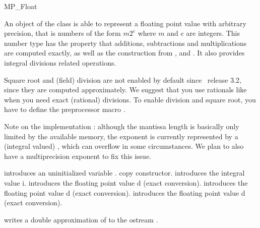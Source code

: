 
\begin{ccRefClass}{MP_Float}

\ccDefinition
An object of the class  is able to represent a floating point
value with arbitrary precision, that is numbers of the form $m2^e$ where
$m$ and $e$ are integers.  This number type has the property that
additions, subtractions and multiplications are computed exactly, as well as
the construction from ,  and .
It also provides integral divisions related operations.

Square root and (field) division are not enabled by default since
\cgal\ release 3.2, since they are computed approximately.  We suggest that you
use rationals like  when you need exact (rational)
divisions.  To enable division and square root, you have to define the
preprocessor macro .

Note on the implementation : although the mantissa length is basically only
limited by the available memory, the exponent is currently represented by a
(integral valued) , which can overflow in some circumstances.  We
plan to also have a multiprecision exponent to fix this issue.


\ccIsModel
{}

\ccCreation
{}

{introduces an uninitialized variable \ccVar.}
\ccGlue
{}
{copy constructor.}
\ccGlue
{}
{introduces the integral value i.}
\ccGlue
{}
{introduces the floating point value d (exact conversion).}
\ccGlue
{}
{introduces the floating point value d (exact conversion).}
\ccGlue
{}
{introduces the floating point value d (exact conversion).}

\ccOperations

{writes a double approximation of  to the ostream .}


\end{ccRefClass}

